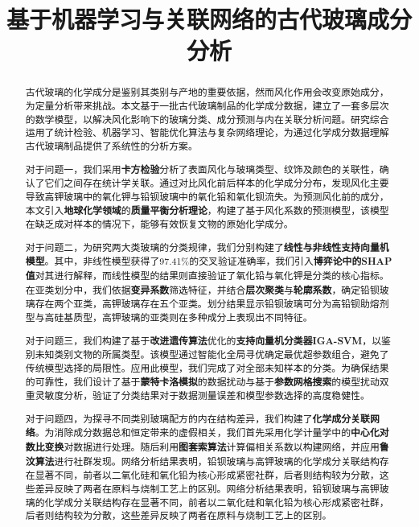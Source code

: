 \documentclass[withoutpreface,bwprint]{cumcmthesis} %
\title{基于机器学习与关联网络的古代玻璃成分分析}
\begin{document}
\maketitle

\begin{abstract}


古代玻璃的化学成分是鉴别其类别与产地的重要依据，然而风化作用会改变原始成分，为定量分析带来挑战。本文基于一批古代玻璃制品的化学成分数据，建立了一套多层次的数学模型，以解决风化影响下的玻璃分类、成分预测与内在关联分析问题。研究综合运用了统计检验、机器学习、智能优化算法与复杂网络理论，为通过化学成分数据理解古代玻璃制品提供了系统性的分析方案。


对于问题一，我们采用\textbf{卡方检验}分析了表面风化与玻璃类型、纹饰及颜色的关联性，确认了它们之间存在统计学关联。通过对比风化前后样本的化学成分分布，发现风化主要导致高钾玻璃中的氧化钾与铅钡玻璃中的氧化铅和氧化钡流失。为预测风化前的成分，本文引入\textbf{地球化学领域}的\textbf{质量平衡分析理论}，构建了基于风化系数的预测模型，该模型在缺乏成对样本的情况下，能够有效恢复文物的原始化学成分。


对于问题二，为研究两大类玻璃的分类规律，我们分别构建了\textbf{线性与非线性支持向量机模型}。其中，非线性模型获得了97.41\%的交叉验证准确率，我们引入\textbf{博弈论中的SHAP值}对其进行解释，而线性模型的结果则直接验证了氧化铅与氧化钾是分类的核心指标。在亚类划分中，我们依据\textbf{变异系数}筛选特征，并结合\textbf{层次聚类}与\textbf{轮廓系数}，确定铅钡玻璃存在两个亚类，高钾玻璃存在五个亚类。划分结果显示铅钡玻璃可分为高铅钡助熔剂型与高硅基质型，高钾玻璃的亚类则在多种成分上表现出不同特征。


对于问题三，我们构建了基于\textbf{改进遗传算法}优化的\textbf{支持向量机分类器IGA-SVM}，以鉴别未知类别文物的所属类型。该模型通过智能化全局寻优确定最优超参数组合，避免了传统模型选择的局限性。应用此模型，我们完成了对全部未知样本的分类。为确保结果的可靠性，我们设计了基于\textbf{蒙特卡洛模拟}的数据扰动与基于\textbf{参数网格搜索}的模型扰动双重灵敏度分析，验证了分类结果对于数据测量误差和模型参数选择的高度稳健性。


对于问题四，为探寻不同类别玻璃配方的内在结构差异，我们构建了\textbf{化学成分关联网络}。为消除成分数据总和恒定带来的虚假相关，我们首先采用化学计量学中的\textbf{中心化对数比变换}对数据进行处理。随后利用\textbf{图套索算法}计算偏相关系数以构建网络，并应用\textbf{鲁汶算法}进行社群发现。网络分析结果表明，铅钡玻璃与高钾玻璃的化学成分关联结构存在显著不同，前者以二氧化硅和氧化铅为核心形成紧密社群，后者则结构较为分散，这些差异反映了两者在原料与烧制工艺上的区别。网络分析结果表明，铅钡玻璃与高钾玻璃的化学成分关联结构存在显著不同，前者以二氧化硅和氧化铅为核心形成紧密社群，后者则结构较为分散，这些差异反映了两者在原料与烧制工艺上的区别。



\end{abstract}










\newpage




\newpage
\end{document}
